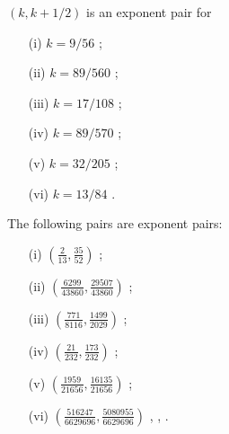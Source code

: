 \begin{theorem}\label{line-sym} $(k,k+1/2)$ is an exponent pair for
\begin{itemize}
\item[(i)] $k = 9/56$ \cite[Theorem~1]{huxley_exponential_1988};
\item[(ii)] $k=89/560$ \cite[Theorem~6]{watt_exponential_1989};
\item[(iii)] $k=17/108$ \cite[p. 467]{huxley_exponential_1991};
\item[(iv)] $k=89/570$ \cite[p. 40]{huxley_exponential_1993};
\item[(v)] $k=32/205$ \cite[Theorem~1]{huxley_exponential_2005};
\item[(vi)] $k=13/84$ \cite[p. 206]{bourgain_decoupling_2017}.
\end{itemize}
\end{theorem}

\literature
{}


\begin{theorem}\label{exp_pair_bombieri-iwaniec}  The following pairs are exponent pairs:
\begin{itemize}
\item[(i)] $(\frac{2}{13}, \frac{35}{52})$ \cite{huxley_watt_exponential_1990};
\item[(ii)] $(\frac{6299}{43860}, \frac{29507}{43860})$ \cite[Table 17.3]{huxley_area_1996};
\item[(iii)] $(\frac{771}{8116}, \frac{1499}{2029})$ \cite[p. 285]{sargos_points_1995};
\item[(iv)] $(\frac{21}{232}, \frac{173}{232})$ \cite[p. 286]{sargos_points_1995};
\item[(v)] $(\frac{1959}{21656}, \frac{16135}{21656})$ \cite[p. 286]{sargos_points_1995};
\item[(vi)] $(\frac{516247}{6629696}, \frac{5080955}{6629696})$ \cite{huxley_exponential_2001}, \cite[Table 19.2]{huxley_area_1996}, \cite{robert_fourth_2002}.
\end{itemize}
\end{theorem}

\literature
{}

